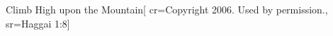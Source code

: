 {Climb High upon the Mountain}[
    cr={Copyright 2006.  Used by permission.},
    sr={Haggai 1:8}]
